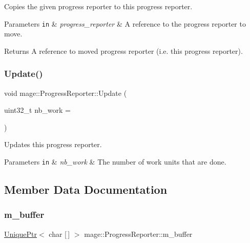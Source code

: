 Copies the given progress reporter to this progress reporter.


\begin{DoxyParams}[1]{Parameters}
\mbox{\tt in}  & {\em progress\+\_\+reporter} & A reference to the progress reporter to move. \\
\hline
\end{DoxyParams}
\begin{DoxyReturn}{Returns}
A reference to moved progress reporter (i.\+e. this progress reporter). 
\end{DoxyReturn}
\hypertarget{classmage_1_1_progress_reporter_a0a5f99f15e4152da9a3d6aadd888244a}{}\label{classmage_1_1_progress_reporter_a0a5f99f15e4152da9a3d6aadd888244a} 
\subsubsection{\texorpdfstring{Update()}{Update()}}
{\footnotesize\ttfamily void mage\+::\+Progress\+Reporter\+::\+Update (\begin{DoxyParamCaption}\item[{uint32\+\_\+t}]{nb\+\_\+work = {} }\end{DoxyParamCaption})}

Updates this progress reporter.


\begin{DoxyParams}[1]{Parameters}
\mbox{\tt in}  & {\em nb\+\_\+work} & The number of work units that are done. \\
\hline
\end{DoxyParams}


\subsection{Member Data Documentation}
\hypertarget{classmage_1_1_progress_reporter_a725763db34f5bbb7408107d55ee43beb}{}\label{classmage_1_1_progress_reporter_a725763db34f5bbb7408107d55ee43beb} 
\subsubsection{\texorpdfstring{m\+\_\+buffer}{m\_buffer}}
{\footnotesize\ttfamily \hyperlink{namespacemage_a8c307fbcc33bce9b7f2aa4c26c3b95cf}{Unique\+Ptr}$<$ char \mbox{[}$\,$\mbox{]} $>$ mage\+::\+Progress\+Reporter\+::m\+\_\+buffer\hspace{0.3cm}{\ttfamily [private]}}

